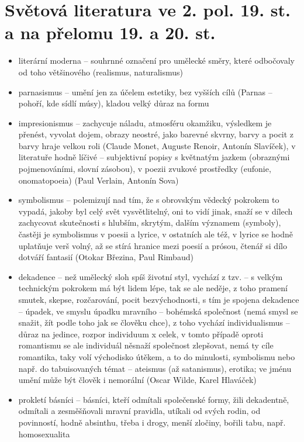\documentclass{article}
\begin{document}
\part{Světová literatura ve 2. pol. 19. st. a na přelomu 19. a 20. st.}
\begin{itemize}
  \item literární moderna -- souhrnné označení pro umělecké směry, které odbočovaly od toho většinového (realismus, naturalismus)
  \item parnasismus -- umění jen za účelem estetiky, bez vyšších cílů (Parnas -- pohoří, kde sídlí músy), kladou velký důraz na formu
  \item impresionismus -- zachycuje náladu, atmosféru okamžiku, výsledkem je přenést, vyvolat dojem, obrazy neostré, jako barevné skvrny, barvy a pocit z barvy hraje velkou roli (Claude Monet, Auguste Renoir, Antonín Slavíček), v literatuře hodně líčivé -- subjektivní popisy s květnatým jazkem (obraznými pojmenováními, slovní zásobou), v poezii zvukové prostředky (eufonie, onomatopoeia) (Paul Verlain, Antonín Sova)
  \item symbolismus -- polemizují nad tím, že s obrovským vědecký pokrokem to vypadá, jakoby byl celý svět vysvětlitelný, oni to vidí jinak, snaží se v dílech zachycovat skutečnosti s hlubším, skrytým, dalším významem (symboly), častěji je symbolismus v poesii a lyrice, v ostatních ale též, v lyrice se hodně uplatňuje verš volný, až se stírá hranice mezi poesií a prósou, čtenář si dílo dotváří fantasií (Otokar Březina, Paul Rimbaud)
  \item dekadence -- než umělecký sloh spíš životní styl, vychází z tzv.  -- s velkým technickým pokrokem má být lidem lépe, tak se ale neděje, z toho pramení smutek, skepse, rozčarování, pocit bezvýchodnosti, s tím je spojena dekadence -- úpadek, ve smyslu úpadku mravního -- bohémská společnost (nemá smysl se snažit, žít podle toho jak se člověku chce), z toho vychází individualismus -- důraz na jedince, rozpor individuum x celek, v tomto případě oproti romantismu se ale individuál něsnaží společnost zlepšovat, nemá ty cíle romantika, taky volí východisko útěkem, a to do minulosti, symbolismu nebo např. do tabuisovaných témat -- ateismus (až satanismus), erotika; ve jménu umění může být člověk i nemorální (Oscar Wilde, Karel Hlaváček)
  \item prokletí básníci -- básníci, kteří odmítali společenské formy, žili dekadentně, odmítali a zesměšňovali mravní pravidla, utíkali od svých rodin, od povinností, hodně absinthu, třeba i drogy, menší zločiny, bořili tabu, např. homosexualita

\end{itemize}
\end{document}
